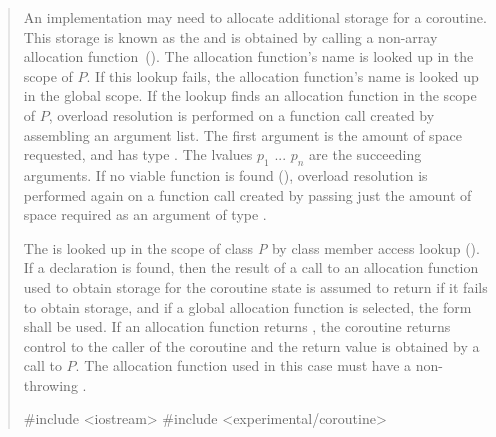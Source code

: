 \begin{quote}
\pnum
An implementation may need to allocate additional storage for a coroutine. 
This storage is known as the  and is obtained by calling a non-array allocation function~().
The allocation function's name is looked up in the scope of $P$. If this lookup fails, the allocation function's name is looked up in the global scope. If the lookup finds an allocation function in the scope of $P$, 
overload resolution is performed on a function call created by assembling an argument list. The first argument is the amount of space requested, and has type . The lvalues $p_1$ ... $p_n$ are the succeeding arguments. If no viable function is found  (), overload resolution is performed again on a function call created by passing just the amount of space required as an argument of type .


\pnum
The   is looked up in the scope of class \textit{P}
by class member access lookup (). If a declaration is found, then the result of a call to an allocation function used to obtain storage for the coroutine state is assumed to return
 if it fails to obtain storage, and if a global allocation function is selected, the  form shall be used.
If an allocation function returns , the coroutine returns control to the caller of the coroutine and the return value is obtained by a call to $P$. 
The allocation function used in this case must have a non-throwing .

\enterexample
\begin{codeblock}
#include <iostream>
#include <experimental/coroutine>


\end{codeblock}
\end{quote}
